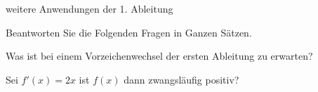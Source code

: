 \documentclass[
    ngerman,
    color=1b,
    load_common,
    leqno,
    boxarc,
    solution=true,
]{rubos-tuda-template}
\begin{document}
\begin{task}[points=2]{weitere Anwendungen der 1. Ableitung}
    \begin{grayInfoBox}
        Beantworten Sie die Folgenden Fragen in Ganzen Sätzen.
    \end{grayInfoBox}
    \begin{cpenumerate}[label=\alph*)]
        \item Was ist bei einem Vorzeichenwechsel der ersten Ableitung zu erwarten?
        \item Sei $f'(x)=2x$ ist $f(x)$ dann zwangsläufig positiv?
    \end{cpenumerate}\mbox{}\\
    \mbox{}
    \dotfill\\[2em]
    \mbox{}
    \dotfill\\[2em]
    \mbox{}\dotfill\\[2em]
    \mbox{}\dotfill
\end{task}
\end{document}
